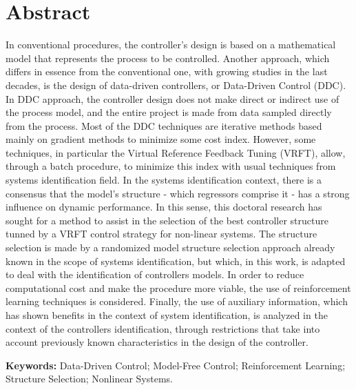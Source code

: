 
\chapter*{Abstract}

\vspace{-2cm}

In conventional procedures, the controller's design is based on a mathematical model that represents the process to be controlled. Another approach, which differs in essence from the conventional one, with growing studies in the last decades, is the design of data-driven controllers, or Data-Driven Control (DDC). In DDC approach, the controller design does not make direct or indirect use of the process model, and the entire project is made from data sampled directly from the process. Most of the DDC techniques are iterative methods based mainly on gradient methods to minimize some cost index. However, some techniques, in particular the Virtual Reference Feedback Tuning (VRFT), allow, through a batch procedure, to minimize this index with usual techniques from systems identification field. In the systems identification context, there is a consensus that the model's structure - which regressors comprise it - has a strong influence on dynamic performance. In this sense, this doctoral research has sought for a method to assist in the selection of the best controller structure tunned by a VRFT control strategy for non-linear systems. The structure selection is made by a randomized model structure selection approach already known in the scope of systems identification, but which, in this work, is adapted to deal with the identification of controllers models. In order to reduce computational cost and make the procedure more viable, the use of reinforcement learning techniques is considered. Finally, the use of auxiliary information, which has shown benefits in the context of system identification, is analyzed in the context of the controllers identification, through restrictions that take into account previously known characteristics in the design of the controller.


\textbf{Keywords:} Data-Driven Control; Model-Free Control; Reinforcement Learning; Structure Selection; Nonlinear Systems.

